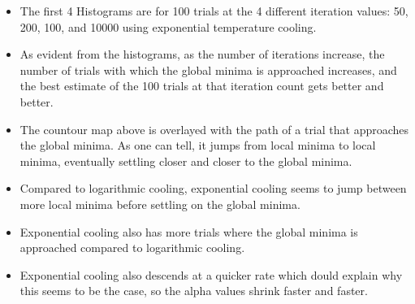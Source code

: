 \documentclass[11pt]{article}
\makeatletter
\providecommand{\tightlist}{%
      \setlength{\itemsep}{0pt}\setlength{\parskip}{0pt}}
\newcommand{\boxspacing}{\kern\kvtcb@left@rule\kern\kvtcb@boxsep}
\newcommand{\prompt}[4]{
        \ttfamily\llap{{\color{#2}[#3]:\hspace{3pt}#4}}\vspace{-\baselineskip}
    }
\makeatother
\begin{document}
    \begin{itemize}
\tightlist
\item
  The first 4 Histograms are for 100 trials at the 4 different iteration
  values: 50, 200, 100, and 10000 using exponential temperature cooling.
\item
  As evident from the histograms, as the number of iterations increase,
  the number of trials with which the global minima is approached
  increases, and the best estimate of the 100 trials at that iteration
  count gets better and better.
\item
  The countour map above is overlayed with the path of a trial that
  approaches the global minima. As one can tell, it jumps from local
  minima to local minima, eventually settling closer and closer to the
  global minima.
\item
  Compared to logarithmic cooling, exponential cooling seems to jump
  between more local minima before settling on the global minima.
\item
  Exponential cooling also has more trials where the global minima is
  approached compared to logarithmic cooling.
\item
  Exponential cooling also descends at a quicker rate which dould
  explain why this seems to be the case, so the alpha values shrink
  faster and faster.
\end{itemize}

    \begin{tcolorbox}[breakable, size=fbox, boxrule=1pt, pad at break*=1mm,colback=cellbackground, colframe=cellborder]
\prompt{In}{incolor}{ }{\boxspacing}
\begin{Verbatim}[commandchars=\\\{\}]

\end{Verbatim}
\end{tcolorbox}


    
    
    
\end{document}
